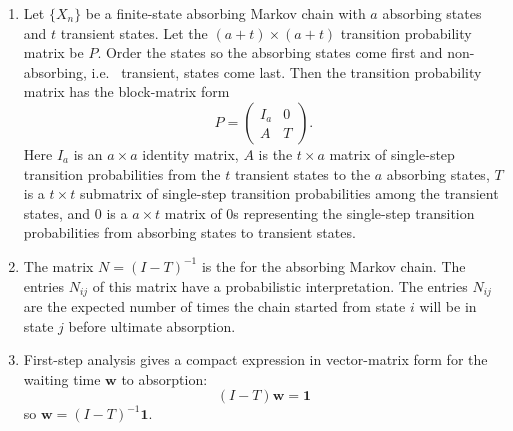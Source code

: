 \documentclass[12pt]{article}
\begin{document}
\begin{enumerate}
    \item
        Let \( \{ X_n \} \) be a finite-state absorbing Markov chain
        with \( a \) absorbing states and \( t \) transient states.  Let
        the \( (a + t) \times (a + t) \) transition probability matrix
        be \( P \).  Order the states so the absorbing states come first
        and non-absorbing, i.e.\ %
        transient, states come last.  Then the transition probability
        matrix has the block-matrix form
        \[
            P =
            \begin{pmatrix}
                I_a & 0 \\
                A & T
            \end{pmatrix}
            .
        \] Here \( I_{a} \) is an \( a \times a \) identity matrix, \( A
        \) is the \( t \times a \) matrix of single-step transition
        probabilities from the \( t \) transient states to the \( a \)
        absorbing states, \( T \) is a \( t \times t \) submatrix of
        single-step transition probabilities among the transient states,
        and \( 0 \) is a \( a \times t \) matrix of \( 0 \)s
        representing the single-step transition probabilities from
        absorbing states to transient states.
    \item
        The matrix \( N = (I-T)^{-1} \) is the %
        for the absorbing Markov chain.  The entries \( N_{ij} \) of
        this matrix have a probabilistic interpretation.  The entries \(
        N_{ij} \) are the expected number of times the chain started
        from state \( i \) will be in state \( j \) before ultimate
        absorption.
    \item
        First-step analysis gives a compact expression in vector-matrix
        form for the waiting time \( \mathbf{w} \) to absorption:
        \[
            (I - T) \mathbf{w} = \mathbf{1}
        \] so \( \mathbf{w} = (I-T)^{-1} \mathbf{1} \).
\end{enumerate}

\hr

\end{document}
